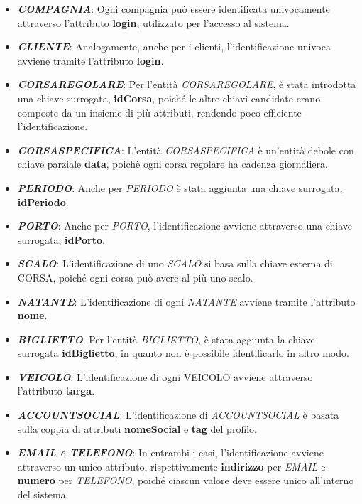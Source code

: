 \begin{itemize}
    \item \textbf{\textit{COMPAGNIA}}: Ogni compagnia può essere identificata univocamente attraverso l'attributo \textbf{login}, utilizzato per l'accesso al sistema.
    
    \item \textbf{\textit{CLIENTE}}: Analogamente, anche per i clienti, l'identificazione univoca avviene tramite l'attributo \textbf{login}.
    
    \item \textbf{\textit{CORSAREGOLARE}}: Per l'entità \textit{CORSAREGOLARE}, è stata introdotta una chiave surrogata, \textbf{idCorsa}, poiché le altre chiavi candidate erano composte da un insieme di più attributi, rendendo poco efficiente l'identificazione.

    \item \textbf{\textit{CORSASPECIFICA}}: L'entità \textit{CORSASPECIFICA} è un'entità debole con chiave parziale \textbf{data}, poichè ogni corsa regolare ha cadenza giornaliera.
    
    \item \textbf{\textit{PERIODO}}: Anche per \textit{PERIODO} è stata aggiunta una chiave surrogata, \textbf{idPeriodo}.
    
    \item \textbf{\textit{PORTO}}:  Anche per \textit{PORTO}, l'identificazione avviene attraverso una chiave surrogata, \textbf{idPorto}.
    
    \item \textbf{\textit{SCALO}}: L'identificazione di uno \textit{SCALO} si basa sulla chiave esterna di CORSA, poiché ogni corsa può avere al più uno scalo.
    
    \item \textbf{\textit{NATANTE}}:  L'identificazione di ogni \textit{NATANTE} avviene tramite l'attributo \textbf{nome}.

    \item \textbf{\textit{BIGLIETTO}}:  Per l'entità \textit{BIGLIETTO}, è stata aggiunta la chiave surrogata \textbf{idBiglietto}, in quanto non è possibile identificarlo in altro modo.

    \item \textbf{\textit{VEICOLO}}: L'identificazione di ogni VEICOLO avviene attraverso l'attributo \textbf{targa}.

    \item \textbf{\textit{ACCOUNTSOCIAL}}: L'identificazione di \textit{ACCOUNTSOCIAL} è basata sulla coppia di attributi \textbf{nomeSocial} e \textbf{tag} del profilo.

    \item \textbf{\textit{EMAIL e TELEFONO}}: In entrambi i casi, l'identificazione avviene attraverso un unico attributo, rispettivamente \textbf{indirizzo} per \textit{EMAIL} e \textbf{numero} per \textit{TELEFONO}, poiché ciascun valore deve essere unico all'interno del sistema.
\end{itemize}
